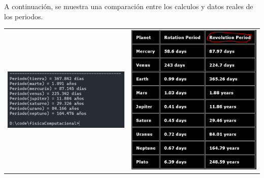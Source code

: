 \documentclass[a4paper,12pt]{article}
\begin{document}
    A continuación, se muestra una comparación entre
    los calculos y datos reales de los periodos.
    \begin{table}[!htbp]
        \centering
        \begin{tabular}{cc}
            \begin{minipage}{.3\textwidth}
                \includegraphics[width=\linewidth]{e4_3}
            \end{minipage}&\begin{minipage}{.3\textwidth}
                \includegraphics[width=\linewidth]{e4real}
            \end{minipage}
        \end{tabular}
    \end{table}
\end{document}
